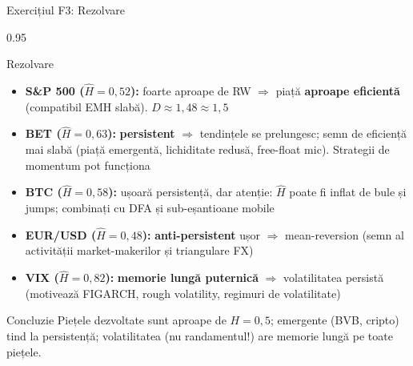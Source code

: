 \documentclass[9pt, aspectratio=169, t]{beamer}
\begin{document}
\begin{frame}[shrink=25]{Exercițiul F3: Rezolvare}
\begin{cminipage}{0.95\textwidth}
\begin{exampleblock}{Rezolvare}
\begin{itemize}\setlength{\itemsep}{0pt}
    \item \textbf{S\&P 500 ($\hat H = 0{,}52$):} foarte aproape de RW $\Rightarrow$ piață \textbf{aproape eficientă} (compatibil EMH slabă). $D \approx 1{,}48 \approx 1{,}5$
    \item \textbf{BET ($\hat H = 0{,}63$):} \textbf{persistent} $\Rightarrow$ tendințele se prelungesc; semn de eficiență mai slabă (piață emergentă, lichiditate redusă, free-float mic). Strategii de momentum pot funcționa
    \item \textbf{BTC ($\hat H = 0{,}58$):} ușoară persistență, dar atenție: $\hat H$ poate fi inflat de bule și jumps; combinați cu DFA și sub-eșantioane mobile
    \item \textbf{EUR/USD ($\hat H = 0{,}48$):} \textbf{anti-persistent} ușor $\Rightarrow$ mean-reversion (semn al activității market-makerilor și triangulare FX)
    \item \textbf{VIX ($\hat H = 0{,}82$):} \textbf{memorie lungă puternică} $\Rightarrow$ volatilitatea persistă (motivează FIGARCH, rough volatility, regimuri de volatilitate)
\end{itemize}
\end{exampleblock}
\begin{block}{Concluzie}
Piețele dezvoltate sunt aproape de $H = 0{,}5$; emergente (BVB, cripto) tind la persistență; volatilitatea (nu randamentul!) are memorie lungă pe toate piețele.
\end{block}
\end{cminipage}
\end{frame}
\end{document}

